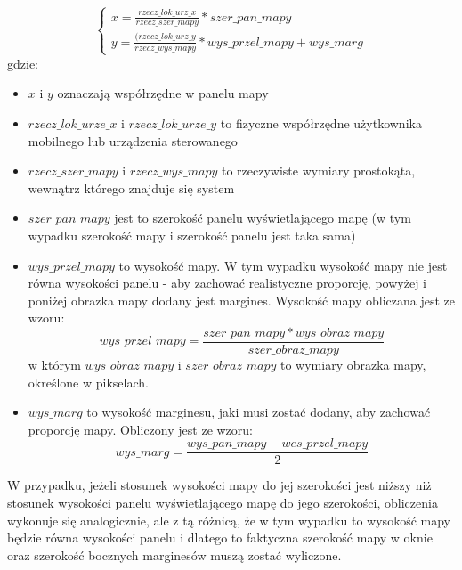 \begin{equation}
\left\{
\begin{array}{l}
x = \frac{rzecz\_lok\_urz\_x}{rzecz\_szer\_mapy} * szer\_pan\_mapy \\
y = \frac{(rzecz\_lok\_urz\_y}{rzecz\_wys\_mapy} * wys\_przel\_mapy + wys\_marg 
\end{array}
\right.
\end{equation}
gdzie:
\begin{itemize}
	\item $x$ i $y$ oznaczają współrzędne w panelu mapy
	\item $rzecz\_lok\_urze\_x$ i $rzecz\_lok\_urze\_y$ to fizyczne współrzędne użytkownika mobilnego lub urządzenia sterowanego
	\item $rzecz\_szer\_mapy$ i $rzecz\_wys\_mapy$ to rzeczywiste wymiary prostokąta, wewnątrz którego znajduje się system
	\item $szer\_pan\_mapy$ jest to szerokość panelu wyświetlającego mapę (w tym wypadku szerokość mapy i szerokość panelu jest taka sama)
	\item $wys\_przel\_mapy$ to wysokość mapy. W tym wypadku wysokość mapy nie jest równa wysokości panelu - aby zachować realistyczne proporcję, powyżej i poniżej obrazka mapy dodany jest margines. Wysokość mapy obliczana jest ze wzoru:
	\begin{equation}
	wys\_przel\_mapy = \frac{szer\_pan\_mapy * wys\_obraz\_mapy}{szer\_obraz\_mapy}
	\end{equation}
	w którym $wys\_obraz\_mapy$ i $szer\_obraz\_mapy$ to wymiary obrazka mapy, określone w pikselach.
	\item $wys\_marg$ to wysokość marginesu, jaki musi zostać dodany, aby zachować proporcję mapy. Obliczony jest ze wzoru:
	\begin{equation}
	wys\_marg = \frac{wys\_pan\_mapy - wes\_przel\_mapy}{2}
	\end{equation}
\end{itemize}
W przypadku, jeżeli stosunek wysokości mapy do jej szerokości jest niższy niż stosunek wysokości panelu wyświetlającego mapę do jego szerokości, obliczenia wykonuje się analogicznie, ale z tą różnicą, że w tym wypadku to wysokość mapy będzie równa wysokości panelu i dlatego to faktyczna szerokość mapy w oknie oraz szerokość bocznych marginesów muszą zostać wyliczone.
